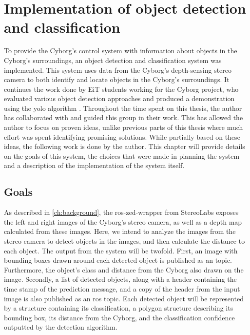 \documentclass[\rootfolder/main.tex]{subfiles}
\begin{document}
\chapter{Implementation of object detection and classification} %
\label{ch:implementation-objdet} %

To provide the Cyborg's control system with information about objects in the Cyborg's surroundings, an object detection and classification system was implemented.
This system uses data from the Cyborg's depth-sensing stereo camera to both identify and locate objects in the Cyborg's surroundings.
It continues the work done by EiT students working for the Cyborg project, who evaluated various object detection approaches and produced a demonstration using the \acrfull{yolo} algorithm \cite{Opheim2018}.
Throughout the time spent on this thesis, the author has collaborated with and guided this group in their work.
This has allowed the author to focus on proven ideas, unlike previous parts of this thesis where much effort was spent identifying promising solutions.
While partially based on these ideas, the following work is done by the author.
This chapter will provide details on the goals of this system, the choices that were made in planning the system and a description of the implementation of the system itself.


\section{Goals}

As described in \cref{ch:background}, the ros-zed-wrapper from StereoLabs exposes the left and right images of the Cyborg's stereo camera, as well as a depth map calculated from these images.
Here, we intend to analyze the images from the stereo camera to detect objects in the images, and then calculate the distance to each object.
The output from the system will be twofold.
First, an image with bounding boxes drawn around each detected object is published as an  topic.
Furthermore, the object's class and distance from the Cyborg also drawn on the image.
Secondly, a list of detected objects, along with a header containing the time stamp of the prediction message, and a copy of the header from the input image is also published as an \acrshort{ros} topic.
Each detected object will be represented by a structure containing its classification, a polygon structure describing its bounding box, its distance from the Cyborg, and the classification confidence outputted by the detection algorithm.
\end{document}
